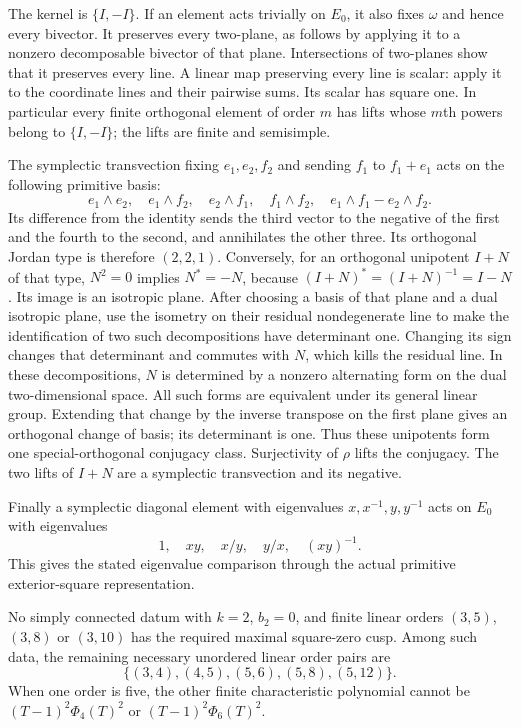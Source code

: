 The kernel is $\{I,-I\}$. If an element acts trivially on
$E_0$, it also fixes $\omega$ and hence every bivector.
It preserves every two-plane, as follows by applying it to a
nonzero decomposable bivector of that plane. Intersections of
two-planes show that it preserves every line. A linear map
preserving every line is scalar: apply it to the coordinate lines
and their pairwise sums. Its scalar has square one. In particular
every finite orthogonal element of order $m$ has lifts whose
$m$th powers belong to $\{I,-I\}$; the lifts are finite and
semisimple.

The symplectic transvection fixing $e_1,e_2,f_2$ and sending
$f_1$ to $f_1+e_1$ acts on the following primitive basis:
\[
 e_1\wedge e_2,\quad e_1\wedge f_2,\quad
 e_2\wedge f_1,\quad f_1\wedge f_2,\quad
 e_1\wedge f_1-e_2\wedge f_2.
\]
Its difference from the identity sends the third vector to
the negative of the first and the fourth to the second, and
annihilates the other three. Its orthogonal Jordan type is
therefore $(2,2,1)$. Conversely, for an orthogonal unipotent
$I+N$ of that type, $N^2=0$ implies $N^*=-N$, because
$(I+N)^*=(I+N)^{-1}=I-N$. Its image is an isotropic plane.
After choosing a basis of that plane and a dual isotropic
plane, use the isometry on their residual nondegenerate line
to make the identification of two such decompositions have
determinant one. Changing its sign changes that determinant
and commutes with $N$, which kills the residual line.
In these decompositions, $N$ is determined by a nonzero alternating form on
the dual two-dimensional space. All such forms are equivalent
under its general linear group. Extending that change by the
inverse transpose on the first plane gives an orthogonal
change of basis; its determinant is one. Thus these unipotents
form one special-orthogonal conjugacy class. Surjectivity of
$\rho$ lifts the conjugacy. The two lifts of $I+N$ are a
symplectic transvection and its negative. 

Finally a symplectic diagonal element with eigenvalues
$x,x^{-1},y,y^{-1}$ acts on $E_0$ with eigenvalues
\[
 1,\quad xy,\quad x/y,\quad y/x,\quad (xy)^{-1}.
\]
This gives the stated eigenvalue comparison through the actual
primitive exterior-square representation.

\begin{theorem}\label{maps:src:F.2.10}


No simply connected datum with $k=2$, $b_2=0$, and finite linear orders
$(3,5)$, $(3,8)$ or $(3,10)$ has the required maximal
square-zero cusp.  Among such data, the
remaining necessary unordered linear order pairs are
\[
 \{(3,4),(4,5),(5,6),(5,8),(5,12)\}.
 \tag{F.30}\label{maps:eq:F.30}
\]
When one order is five, the other finite characteristic
polynomial cannot be $(T-1)^2\Phi_4(T)^2$ or
$(T-1)^2\Phi_6(T)^2$.

\end{theorem}


